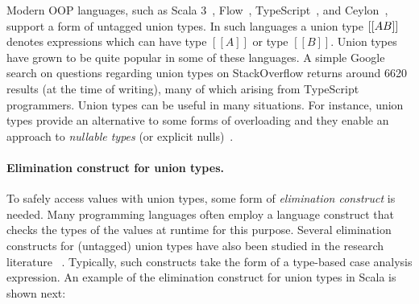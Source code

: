 Modern OOP languages, such as Scala 3~\citep{scala3doc}, Flow~\citep{chaudhuri2015flow},
TypeScript~\citep{bierman2014understanding}, and Ceylon~\citep{king2013ceylon}, support a form
of untagged union types.
In such languages a union type $[[A \/ B]]$ denotes expressions which can have type
$[[A]]$ or type $[[B]]$. Union types have grown to be quite popular in some
of these languages. A simple Google search on questions regarding union types
on StackOverflow returns around 6620 results
(at the time of writing),
many of which arising from TypeScript programmers.
Union types can be useful in many situations.
For instance, union types provide an alternative to some forms
of overloading and they enable an approach to \emph{nullable types} 
(or explicit nulls)~\citep{gunnerson2012nullable,nieto20nulls}.
\begin{comment}
For instance, union types provide an alternative to some forms
of overloading. The idea is that a function that takes an argument
with a union type acts similarly to an overloaded function.
Furthermore, union types have other uses, such as modelling error handling,
or allowing an approach to \emph{nullable types} (or explicit nulls)~\cite{gunnerson2012nullable,nieto20nulls}.
Languages like Ceylon or Scala 3, for example, support nullable types via
union types. In such languages, the \lstinline{null} reference
can only be assigned to values that have type \lstinline{Null} (or some supertype).
To declare a variable of type \lstinline{String}
that can be \lstinline{null} the variable must have the union type
\lstinline{$[[String\/Null]]$}
(which is a supertype of \lstinline{Null}).
This allows programmers to control which variables can have \lstinline{null} references or
not, giving more static assurances, while helping to prevent various bugs
involving \lstinline{null} pointers.
\end{comment}

\paragraph{Elimination construct for union types.}
To safely access values with union types, some form of
\emph{elimination construct} is needed. Many programming languages often
employ a language construct that checks
the types of the values at runtime for this purpose.
Several elimination constructs for (untagged) union types
have also been studied in the research literature~
\citep{benzaken2003cduce,dunfield2014elaborating,castagna:settheoretic}.
Typically, such constructs take the form of a type-based case analysis
expression. An example of the elimination construct for
union types in Scala is shown next:

